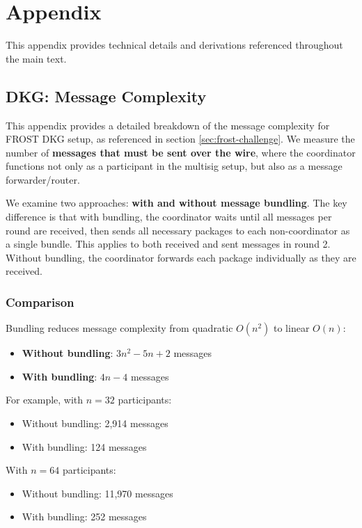 \section{Appendix}

This appendix provides technical details and derivations referenced throughout the main text.

\subsection{DKG: Message Complexity}
\label{appendix:dkg-message-complexity}

This appendix provides a detailed breakdown of the message complexity for FROST DKG setup, as referenced in section \ref{sec:frost-challenge}. We measure the number of \textbf{messages that must be sent over the wire}, where the coordinator functions not only as a participant in the multisig setup, but also as a message forwarder/router.

We examine two approaches: \textbf{with and without message bundling}. The key difference is that with bundling, the coordinator waits until all messages per round are received, then sends all necessary packages to each non-coordinator as a single bundle. This applies to both received and sent messages in round 2. Without bundling, the coordinator forwards each package individually as they are received.

\subsubsection{Comparison}

Bundling reduces message complexity from quadratic $O(n^2)$ to linear $O(n)$:

\begin{itemize}
    \item \textbf{Without bundling}: $3n^2-5n+2$ messages
    \item \textbf{With bundling}: $4n-4$ messages
\end{itemize}

For example, with $n=32$ participants:
\begin{itemize}
    \item Without bundling: 2,914 messages
    \item With bundling: 124 messages
\end{itemize}

With $n=64$ participants:
\begin{itemize}
    \item Without bundling: 11,970 messages
    \item With bundling: 252 messages
\end{itemize}


